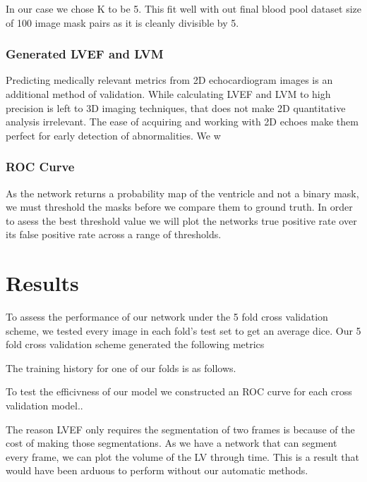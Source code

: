 \documentclass[12pt]{article}
\begin{document}
In our case we chose K to be 5.
This fit well with out final blood pool dataset size of 100 image mask pairs as it is cleanly divisible by 5.


\subsubsection{Generated LVEF and LVM}
Predicting medically relevant metrics from 2D echocardiogram images is an additional method of validation.
While calculating LVEF and LVM to high precision is left to 3D imaging techniques, that does not make 2D quantitative analysis irrelevant.
The ease of acquiring and working with 2D echoes make them perfect for early detection of abnormalities.
We w

\subsubsection{ROC Curve}
As the network returns a probability map of the ventricle and not a binary mask, we must threshold the masks before we compare them to ground truth.
In order to asess the best threshold value we will plot the networks true positive rate over its false positive rate across a range of thresholds.

\section{Results}
To assess the performance of our network under the 5 fold cross validation scheme, we tested every image in each fold's test set to get an average dice.
Our 5 fold cross validation scheme generated the following metrics


The training history for one of our folds is as follows.

To test the efficivness of our model we constructed an ROC curve for each cross validation model..


The reason LVEF only requires the segmentation of two frames is because of the cost of making those segmentations.
As we have a network that can segment every frame, we can plot the volume of the LV through time.
This is a result that would have been arduous to perform without our automatic methods.
\end{document}
